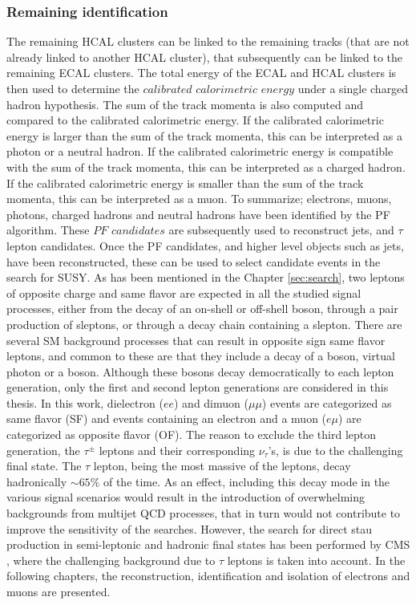 \subsubsection*{Remaining identification}
\noindent\justify
The remaining HCAL clusters can be linked to the remaining tracks (that are not already linked to another HCAL cluster), that subsequently can be linked to the remaining ECAL clusters. 
The total energy of the ECAL and HCAL clusters is then used to determine the $calibrated$ $calorimetric$ $energy$ under a single charged hadron hypothesis. 
The sum of the track momenta is also computed and compared to the calibrated calorimetric energy. 
If the calibrated calorimetric energy is larger than the sum of the track momenta, this can be interpreted as a photon or a neutral hadron. 
If the calibrated calorimetric energy is compatible with the sum of the track momenta, this can be interpreted as a charged hadron. 
If the calibrated calorimetric energy is smaller than the sum of the track momenta, this can be interpreted as a muon. 
\newpara
\noindent\justify
To summarize; electrons, muons, photons, charged hadrons and neutral hadrons have been identified by the PF algorithm. 
These $PF$ $candidates$ are subsequently used to reconstruct jets, \ptmiss and $\tau$ lepton candidates.   
\newpara
\noindent\justify
Once the PF candidates, and higher level objects such as jets, have been reconstructed, these can be used to select candidate events in the search for SUSY. 
As has been mentioned in the Chapter \ref{sec:search}, two leptons of opposite charge and same flavor are expected in all the studied signal processes, either from the decay of an on-shell or off-shell \PZ boson, through a pair production of sleptons, or through a decay chain containing a slepton.  
There are several SM background processes that can result in opposite sign same flavor leptons, and common to these are that they include a decay of a \PZ boson, virtual photon or a \PW boson. 
Although these bosons decay democratically to each lepton generation, only the first and second lepton generations are considered in this thesis. 
In this work, dielectron ($ee$) and dimuon ($\mu\mu$) events are categorized as same flavor (SF) and events containing an electron and a muon ($e\mu$) are categorized as opposite flavor (OF). 
The reason to exclude the third lepton generation, the $\tau^{\pm}$ leptons and their corresponding $\nu_{\tau}$'s, is due to the challenging final state. 
The $\tau$ lepton, being the most massive of the leptons, decay hadronically $\sim65\%$ of the time. 
As an effect, including this decay mode in the various signal scenarios would result in the introduction of overwhelming backgrounds from multijet QCD processes, that in turn would not contribute to improve the sensitivity of the searches. 
However, the search for direct stau production in semi-leptonic and hadronic final states has been performed by CMS \cite{CMS-PAS-SUS-17-002,Sirunyan:2018vig}, where the challenging background due to $\tau$ leptons is taken into account.  
In the following chapters, the reconstruction, identification and isolation of electrons and muons are presented. 
